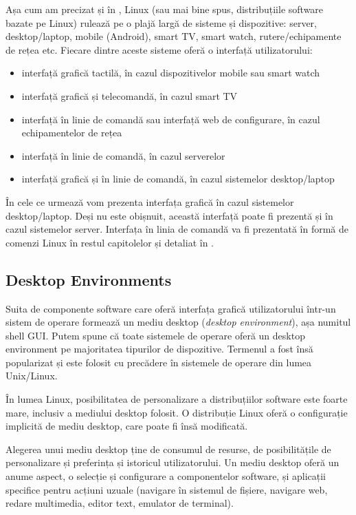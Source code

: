 Așa cum am precizat și în , Linux (sau mai bine spus, distribuțiile software bazate pe Linux) rulează pe o plajă largă de sisteme și dispozitive: server, desktop/laptop, mobile (Android), smart TV, smart watch, rutere/echipamente de rețea etc.
Fiecare dintre aceste sisteme oferă o interfață utilizatorului:

\begin{itemize}
  \item interfață grafică tactilă, în cazul dispozitivelor mobile sau smart watch
  \item interfață grafică și telecomandă, în cazul smart TV
  \item interfață în linie de comandă sau interfață web de configurare, în cazul echipamentelor de rețea
  \item interfață în linie de comandă, în cazul serverelor
  \item interfață grafică și în linie de comandă, în cazul sistemelor desktop/laptop
\end{itemize}

În cele ce urmează vom prezenta interfața grafică în cazul sistemelor desktop/laptop.
Deși nu este obișnuit, această interfață poate fi prezentă și în cazul sistemelor server.
Interfața în linia de comandă va fi prezentată în formă de comenzi Linux în restul capitolelor și detaliat în .

\subsection{Desktop Environments}
\label{sec:ui:desktop-environments}

Suita de componente software care oferă interfața grafică utilizatorului într-un sistem de operare formează un mediu desktop (\textit{desktop environment}), așa numitul shell GUI.
Putem spune că toate sistemele de operare oferă un desktop environment pe majoritatea tipurilor de dispozitive.
Termenul a fost însă popularizat și este folosit cu precădere în sistemele de operare din lumea Unix/Linux.

În lumea Linux, posibilitatea de personalizare a distribuțiilor software este foarte mare, inclusiv a mediului desktop folosit.
O distribuție Linux oferă o configurație implicită de mediu desktop, care poate fi însă modificată.

Alegerea unui mediu desktop ține de consumul de resurse, de posibilitățile de personalizare și preferința și istoricul utilizatorului.
Un mediu desktop oferă un anume aspect, o selecție și configurare a componentelor software, și aplicații specifice pentru acțiuni uzuale (navigare în sistemul de fișiere, navigare web, redare multimedia, editor text, emulator de terminal).

